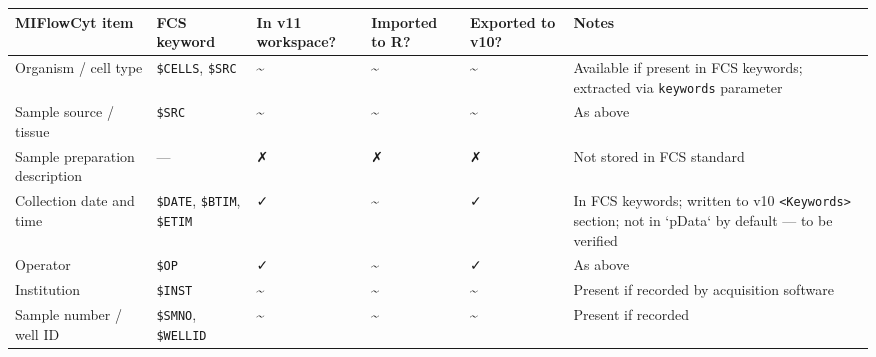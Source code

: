 \documentclass[
]{article}
\begin{document}
\begin{longtable}[]{@{}
  >{\raggedright\arraybackslash}p{}
  >{\raggedright\arraybackslash}p{}
  >{\raggedright\arraybackslash}p{}
  >{\raggedright\arraybackslash}p{}
  >{\raggedright\arraybackslash}p{}
  >{\raggedright\arraybackslash}p{}@{}}
\toprule\noalign{}
\begin{minipage}[b]{\linewidth}\raggedright
MIFlowCyt item
\end{minipage} & \begin{minipage}[b]{\linewidth}\raggedright
FCS keyword
\end{minipage} & \begin{minipage}[b]{\linewidth}\raggedright
In v11 workspace?
\end{minipage} & \begin{minipage}[b]{\linewidth}\raggedright
Imported to R?
\end{minipage} & \begin{minipage}[b]{\linewidth}\raggedright
Exported to v10?
\end{minipage} & \begin{minipage}[b]{\linewidth}\raggedright
Notes
\end{minipage} \\
\midrule\noalign{}
\endhead
\bottomrule\noalign{}
\endlastfoot
Organism / cell type & \texttt{\$CELLS}, \texttt{\$SRC} &
\textasciitilde{} & \textasciitilde{} & \textasciitilde{} & Available if
present in FCS keywords; extracted via \texttt{keywords} parameter \\
Sample source / tissue & \texttt{\$SRC} & \textasciitilde{} &
\textasciitilde{} & \textasciitilde{} & As above \\
Sample preparation description & --- & ✗ & ✗ & ✗ & Not stored in FCS
standard \\
Collection date and time & \texttt{\$DATE}, \texttt{\$BTIM},
\texttt{\$ETIM} & ✓ & \textasciitilde{} & ✓ & In FCS keywords; written
to v10 \texttt{\textless{}Keywords\textgreater{}} section;
\textcolor{pending}{not in `pData` by default — to be verified} \\
Operator & \texttt{\$OP} & ✓ & \textasciitilde{} & ✓ & As above \\
Institution & \texttt{\$INST} & \textasciitilde{} & \textasciitilde{} &
\textasciitilde{} & Present if recorded by acquisition software \\
Sample number / well ID & \texttt{\$SMNO}, \texttt{\$WELLID} &
\textasciitilde{} & \textasciitilde{} & \textasciitilde{} & Present if
recorded \\
\end{longtable}
\end{document}
